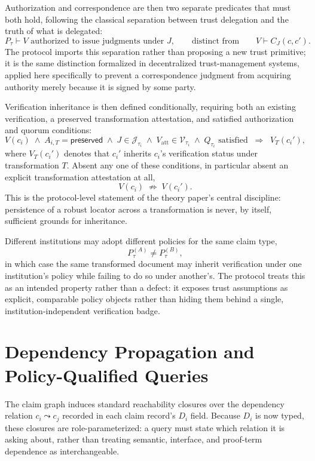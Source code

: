 \documentclass[11pt]{article}
\begin{document}
Authorization and correspondence are then two separate predicates that must both hold, following the classical separation between trust delegation and the truth of what is delegated:
\[
P_\tau \vdash V \text{ authorized to issue judgments under } J,
\qquad\text{distinct from}\qquad
V \vdash C_J(c,c').
\]
The protocol imports this separation rather than proposing a new trust primitive; it is the same distinction formalized in decentralized trust-management systems, applied here specifically to prevent a correspondence judgment from acquiring authority merely because it is signed by some party.

Verification inheritance is then defined conditionally, requiring both an existing verification, a preserved transformation attestation, and satisfied authorization and quorum conditions:
\[
V(c_i) \;\wedge\; A_{i,T} = \textsf{preserved} \;\wedge\; J \in \mathcal{J}_{\tau_i} \;\wedge\; V_{\text{att}} \in \mathcal{V}_{\tau_i} \;\wedge\; Q_{\tau_i} \text{ satisfied}
\;\;\Longrightarrow\;\;
V_T(c_i'),
\]
where $V_T(c_i')$ denotes that $c_i'$ inherits $c_i$'s verification status under transformation $T$. Absent any one of these conditions, in particular absent an explicit transformation attestation at all,
\[
V(c_i) \;\not\Rightarrow\; V(c_i').
\]
This is the protocol-level statement of the theory paper's central discipline: persistence of a robust locator across a transformation is never, by itself, sufficient grounds for inheritance.

Different institutions may adopt different policies for the same claim type,
\[
P_\tau^{(A)} \neq P_\tau^{(B)},
\]
in which case the same transformed document may inherit verification under one institution's policy while failing to do so under another's. The protocol treats this as an intended property rather than a defect: it exposes trust assumptions as explicit, comparable policy objects rather than hiding them behind a single, institution-independent verification badge.

\section{Dependency Propagation and Policy-Qualified Queries}

The claim graph induces standard reachability closures over the dependency relation $c_i \leadsto c_j$ recorded in each claim record's $D_i$ field. Because $D_i$ is now typed, these closures are role-parameterized: a query must state which relation it is asking about, rather than treating semantic, interface, and proof-term dependence as interchangeable.
\end{document}
